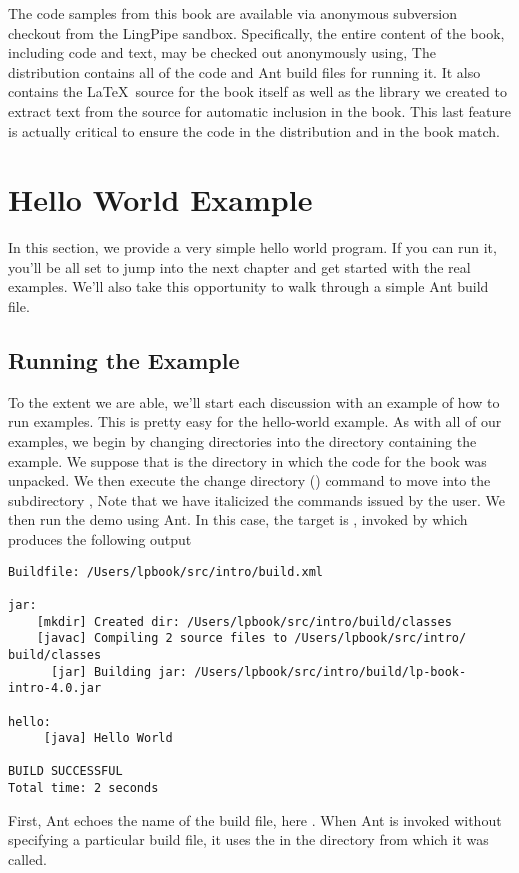 The code samples from this book are available via anonymous subversion checkout
from the LingPipe sandbox.  Specifically, the entire content of the book,
including code and text, may be checked out anonymously using,
%
%
The distribution contains all of the code and Ant build files for
running it.  It also contains the \LaTeX\ source for the book itself
as well as the library we created to extract text from the source for
automatic inclusion in the book.  This last feature is actually
critical to ensure the code in the distribution and in the book match.  


\section{Hello World Example}

In this section, we provide a very simple hello world program.  If you
can run it, you'll be all set to jump into the next chapter and get
started with the real examples.  We'll also take this opportunity to
walk through a simple Ant build file.

\subsection{Running the Example}

To the extent we are able, we'll start each discussion with an example
of how to run examples.  This is pretty easy for the hello-world
example.  As with all of our examples, we begin by changing
directories into the directory containing the example.  We suppose
that \relpath{} is the directory in which the code for the book was unpacked.
We then execute the change directory () command to move
into the subdirectory ,
%
%
Note that we have italicized the commands issued by the user.
%
We then run the demo using Ant.  In this case, the target is ,
invoked by
%
%
which produces the following output
%
\begin{verbatim}
Buildfile: /Users/lpbook/src/intro/build.xml

jar:
    [mkdir] Created dir: /Users/lpbook/src/intro/build/classes
    [javac] Compiling 2 source files to /Users/lpbook/src/intro/
build/classes
      [jar] Building jar: /Users/lpbook/src/intro/build/lp-book-
intro-4.0.jar

hello:
     [java] Hello World

BUILD SUCCESSFUL
Total time: 2 seconds
\end{verbatim}
%
First, Ant echoes the name of the build file, here
.  When Ant is
invoked without specifying a particular build file, it uses the
 in the directory from which it was called.  

